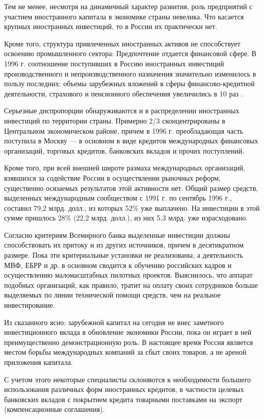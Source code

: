 Тем не менее, несмотря на динамичный характер развития, роль предприятий с участием иностранного капитала в экономике страны невелика. Что касается крупных иностранных инвестиций, то в России их практически нет.

Кроме того, структура привлеченных иностранных активов не способствует освоению промышленного сектора: Предпочтение отдается финансовой сфере. В 1996 г. соотношение поступивших в Россию иностранных инвестиций производственного и непроизводственного назначения значительно изменилось в пользу последних: объемы зарубежных вложений в сферы финансово-кредитной деятельности, страхового и пенсионного обеспечения увеличились в 10 раз .

Серьезные диспропорции обнаруживаются и в распределении иностранных инвестиций по территории страны. Примерно 2/3 сконцентрированы в Центральном экономическом районе, причем в 1996 г. преобладающая часть поступила в Москву  --- в основном в виде кредитов международных финансовых организаций, торговых кредитов, банковских вкладов и прочих поступлений.

Кроме того, при всей внешней широте размаха международных организаций, взявшихся за содействие России в осуществлении рыночных реформ, существенно осязаемых результатов этой активности нет. Общий размер средств, выделенных международным сообществом с 1991 г. по сентябрь 1996 г., составил 79,2 млрд. долл., из которых 52\% уже выплачено. На инвестиции в этой сумме пришлось 28\% (22,2 млрд. долл.), из них 5,3 млрд. уже израсходовано.

Согласно критериям Всемирного банка выделенные инвестиции должны способствовать их притоку и из других источников, причем в десятикратном размере. Пока эти критериальные установки не реализованы, а деятельность МВФ, ЕБРР и др. в основном сводится к обучению российских кадров и осуществлению маломасштабных пилотных проектов. Выяснилось, что аппарат подобных организаций, как правило, тратит на оплату своих сотрудников больше выделяемых по линии технической помощи средств, чем на реальное инвестирование.

Из сказанного ясно: зарубежной капитал на сегодня не внес заметного инвестиционного вклада в обновление экономики России, пока он играет в ней преимущественно демонстрационную роль. В настоящее время Россия является местом борьбы международных компаний за сбыт своих товаров, а не ареной приложения капитала.

С учетом этого некоторые специалисты склоняются к необходимости большего использования различных форм иностранных кредитов, в частности целевых банковских вкладов с покрытием кредита товарными поставками на экспорт (компенсационные соглашения).

